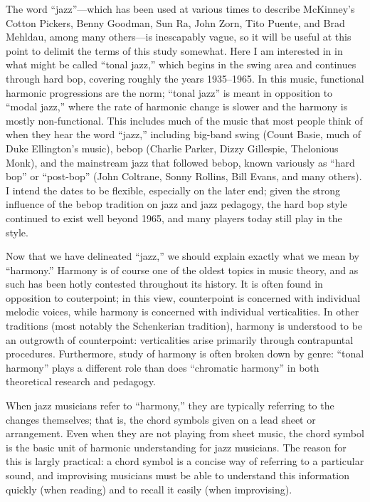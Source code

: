 \documentclass[diss]{subfiles}
\begin{document}
The word “jazz”---which has been used at various times to describe McKinney’s
Cotton Pickers, Benny Goodman, Sun Ra, John Zorn, Tito Puente, and Brad
Mehldau, among many others---is inescapably vague, so it will be useful at
this point to delimit the terms of this study somewhat. Here I am interested
in in what might be called “tonal jazz,” which begins in the swing area and
continues through hard bop, covering roughly the years 1935--1965. In this
music, functional harmonic progressions are the norm; “tonal jazz” is
meant in opposition to “modal jazz,” where the rate of harmonic change is
slower and the harmony is mostly non-functional. This includes much
of the music that most people think of when they hear the word “jazz,”
including big-band swing (Count Basie, much of Duke Ellington’s music), bebop
(Charlie Parker, Dizzy Gillespie, Thelonious Monk), and the mainstream jazz
that followed bebop, known variously as “hard bop” or “post-bop” (John
Coltrane, Sonny Rollins, Bill Evans, and many others). I intend the dates to
be flexible, especially on the later end; given the strong influence of the
bebop tradition on jazz and jazz pedagogy, the hard bop style continued to
exist well beyond 1965, and many players today still play in the
style.

Now that we have delineated “jazz,” we should explain exactly what we mean by
“harmony.” Harmony is of course one of the oldest topics in music theory, and
as such has been hotly contested throughout its history. It is often
found in opposition to couterpoint; in this view, counterpoint is concerned
with individual melodic voices, while harmony is concerned with individual
verticalities. In other traditions (most notably the Schenkerian tradition),
harmony is understood to be an outgrowth of counterpoint: verticalities arise
primarily through contrapuntal procedures. Furthermore, study of harmony is
often broken down by genre: “tonal harmony” plays a different role than does
“chromatic harmony” in both theoretical research and pedagogy.

When jazz musicians refer to “harmony,” they are typically referring to the
changes themselves; that is, the chord symbols given on a lead sheet or
arrangement. Even when they are not playing from sheet music, the chord symbol
is the basic unit of harmonic understanding for jazz musicians. The reason for
this is largly practical: a chord symbol is a concise way of referring to a
particular sound, and improvising musicians must be able to understand this
information quickly (when reading) and to recall it easily (when improvising).
\end{document}
